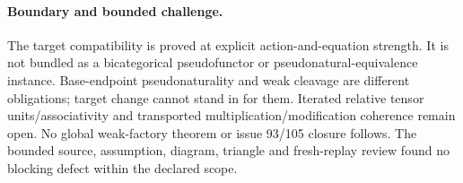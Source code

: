 \documentclass{article}
\begin{document}
\paragraph{Boundary and bounded challenge.} The target compatibility is proved at explicit action-and-equation strength. It is not bundled as a bicategorical pseudofunctor or pseudonatural-equivalence instance. Base-endpoint pseudonaturality and weak cleavage are different obligations; target change cannot stand in for them. Iterated relative tensor units/associativity and transported multiplication/modification coherence remain open. No global weak-factory theorem or issue 93/105 closure follows. The bounded source, assumption, diagram, triangle and fresh-replay review found no blocking defect within the declared scope.
\end{document}
